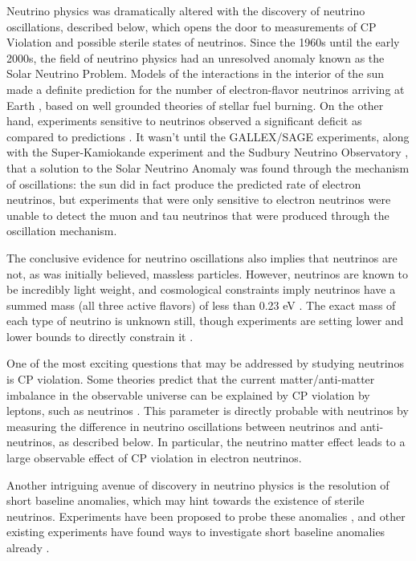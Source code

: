 Neutrino physics was dramatically altered with the discovery of neutrino oscillations, described below, which opens the door to measurements of CP Violation and possible sterile states of neutrinos.  Since the 1960s until the early 2000s, the field of neutrino physics had an unresolved anomaly known as the Solar Neutrino Problem.  Models of the interactions in the interior of the sun made a definite prediction for the number of electron-flavor neutrinos arriving at Earth \cite{Bahcall:2004pz}, based on well grounded theories of stellar fuel burning.  On the other hand, experiments sensitive to neutrinos observed a significant deficit as compared to predictions \cite{Davis:1968cp}.  It wasn't until the GALLEX/SAGE \cite{Hampel:1997fc, Abdurashitov:1998ne} experiments, along with the Super-Kamiokande experiment \cite{PhysRevLett.81.1562} and the Sudbury Neutrino Observatory \cite{Ahmad:2002jz}, that a solution to the Solar Neutrino Anomaly was found through the mechanism of oscillations: the sun did in fact produce the predicted rate of electron neutrinos, but experiments that were only sensitive to electron neutrinos were unable to detect the muon and tau neutrinos that were produced through the oscillation mechanism.  

The conclusive evidence for neutrino oscillations also implies that neutrinos are not, as was initially believed, massless particles.  However, neutrinos are known to be incredibly light weight, and cosmological constraints imply neutrinos have a summed mass (all three active flavors) of less than 0.23 eV \cite{Abazajian:2011dt, Ade:2013zuv}.  The exact mass of each type of neutrino is unknown still, though experiments are setting lower and lower bounds to directly constrain it \cite{BORNSCHEIN200514, Mertens:2014nha}.

One of the most exciting questions that may be addressed by studying neutrinos is CP violation.  Some theories predict that the current matter/anti-matter imbalance in the observable universe can be explained by CP violation by leptons, such as neutrinos \cite{Nunokawa:2007qh}.  This parameter is directly probable with neutrinos by measuring the difference in neutrino oscillations between neutrinos and anti-neutrinos, as described below.  In particular, the neutrino matter effect \cite{Wolfenstein:1977ue, Mikheev:1986gs} leads to a large observable effect of CP violation in electron neutrinos.

Another intriguing avenue of discovery in neutrino physics is the resolution of short baseline anomalies, which may hint towards the existence of sterile neutrinos.  Experiments have been proposed to probe these anomalies \cite{Antonello:2015lea, Ashenfelter:2015uxt}, and other existing experiments have found ways to investigate short baseline anomalies already \cite{TheIceCube:2016oqi, Adamson:2010wi, MINOS:2016viw, An:2014bik}.

